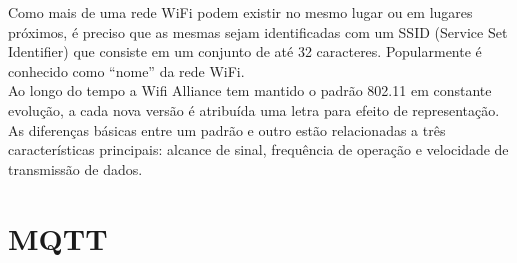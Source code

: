 \begin{figure}[h!]
	\centering
\end{figure}

Como mais de uma rede WiFi podem existir no mesmo lugar ou em lugares próximos, é preciso que as mesmas sejam identificadas com um SSID (Service Set Identifier) que consiste em um conjunto de até 32 caracteres. Popularmente é conhecido como ``nome'' da rede WiFi. \\
\indent Ao longo do tempo a Wifi Alliance tem mantido o padrão 802.11 em constante evolução, a cada nova versão é atribuída uma letra para efeito de representação. As diferenças básicas entre um padrão e outro estão relacionadas a três características principais: alcance de sinal, frequência de operação e velocidade de transmissão de dados.

\begin{quadro}[h!]	
	\centering
\end{quadro}

\section{MQTT}
\label{sec:mqtt}

